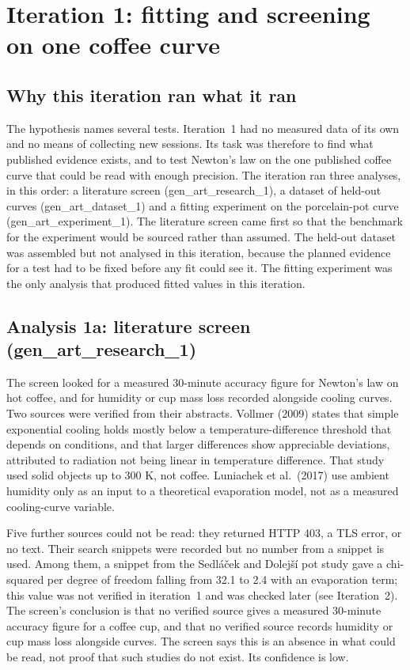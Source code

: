 \documentclass[11pt,letterpaper]{article}
\begin{document}
\section{Iteration 1: fitting and screening on one coffee curve}

\subsection{Why this iteration ran what it ran}

The hypothesis names several tests. Iteration~1 had no measured data of its own and no means of collecting new sessions. Its task was therefore to find what published evidence exists, and to test Newton's law on the one published coffee curve that could be read with enough precision. The iteration ran three analyses, in this order: a literature screen (gen\_art\_research\_1), a dataset of held-out curves (gen\_art\_dataset\_1) and a fitting experiment on the porcelain-pot curve (gen\_art\_experiment\_1). The literature screen came first so that the benchmark for the experiment would be sourced rather than assumed. The held-out dataset was assembled but not analysed in this iteration, because the planned evidence for a test had to be fixed before any fit could see it. The fitting experiment was the only analysis that produced fitted values in this iteration.

\subsection{Analysis 1a: literature screen (gen\_art\_research\_1)}

The screen looked for a measured 30-minute accuracy figure for Newton's law on hot coffee, and for humidity or cup mass loss recorded alongside cooling curves. Two sources were verified from their abstracts. Vollmer (2009) states that simple exponential cooling holds mostly below a temperature-difference threshold that depends on conditions, and that larger differences show appreciable deviations, attributed to radiation not being linear in temperature difference. That study used solid objects up to 300 K, not coffee. Luniachek et al.\ (2017) use ambient humidity only as an input to a theoretical evaporation model, not as a measured cooling-curve variable.

Five further sources could not be read: they returned HTTP 403, a TLS error, or no text. Their search snippets were recorded but no number from a snippet is used. Among them, a snippet from the Sedl\'{a}\v{c}ek and Dolej\v{s}\'{i} pot study gave a chi-squared per degree of freedom falling from 32.1 to 2.4 with an evaporation term; this value was not verified in iteration~1 and was checked later (see Iteration~2). The screen's conclusion is that no verified source gives a measured 30-minute accuracy figure for a coffee cup, and that no verified source records humidity or cup mass loss alongside curves. The screen says this is an absence in what could be read, not proof that such studies do not exist. Its confidence is low.
\end{document}
